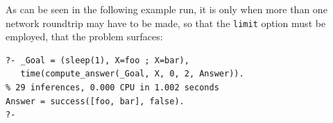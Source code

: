 \noindent As can be seen in the following example run, it is only when more than one network roundtrip may have to be made, so that the \texttt{limit} option must be employed, that the problem surfaces:

\begin{verbatim}
?- _Goal = (sleep(1), X=foo ; X=bar),
   time(compute_answer(_Goal, X, 0, 2, Answer)).
% 29 inferences, 0.000 CPU in 1.002 seconds
Answer = success([foo, bar], false).
?-
\end{verbatim}



